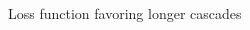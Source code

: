 \begin{frame}{Loss function favoring longer cascades}
\begin{columns}
\begin{column}{0.35\textwidth}

\end{column}
\end{columns}
\end{frame}
